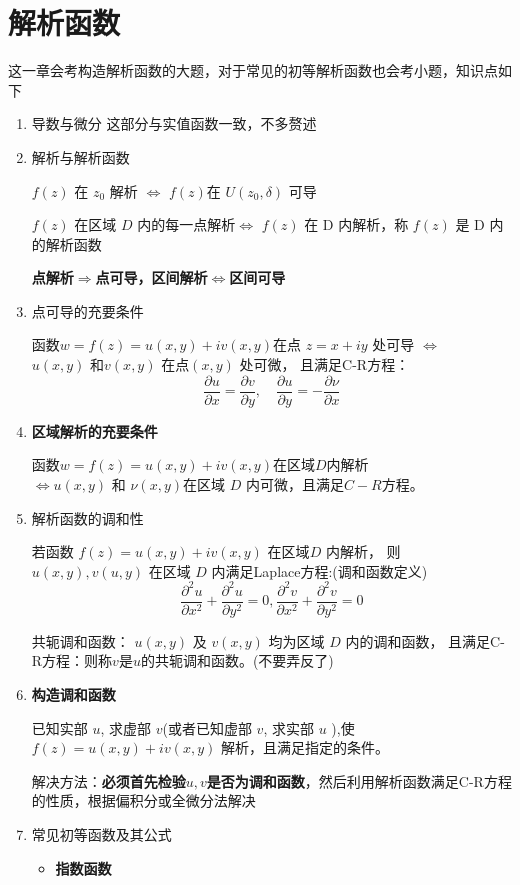 \documentclass[a4paper,11pt,UTF8]{article}
\begin{document}
\section{解析函数}
这一章会考构造解析函数的大题，对于常见的初等解析函数也会考小题，知识点如下
\begin{enumerate}
	\item 导数与微分
	这部分与实值函数一致，不多赘述
	\item 解析与解析函数
	
	$f(z)$ 在 $z_0$ 解析 $\Leftrightarrow$ $f(z)$在 $U(z_0,\delta)$ 可导
	
	$f(z)$ 在区域 $D$ 内的每一点解析$\Leftrightarrow$ $f(z)$ 在 D 内解析，称 $f(z)$ 是 D 内的解析函数
	
	\textbf{点解析$\Rightarrow$点可导，区间解析$\Leftrightarrow$区间可导}
	\item 点可导的充要条件
	
	函数$w=f(z)=u(x,y)+iv(x,y)$在点 $z=x+iy$ 处可导
	$\Leftrightarrow$\\
	$u(x,y)$ 和$v(x,y)$ 在点$(x,y)$ 处可微， 且满足C-R方程：
	$$\frac{\partial u}{\partial x}=\frac{\partial v}{\partial y},\quad\frac{\partial u}{\partial y}=-\frac{\partial\nu}{\partial x}$$
	\item \textbf{区域解析的充要条件}
	
	函数$w=f(z)=u(x,y)+iv(x,y)$在区域$D$内解析\\
	$\Leftrightarrow$$u(x,y)$ 和 $\nu(x,y)$在区域 $D$ 内可微，且满足$C-R$方程。
	\item 解析函数的调和性
	
	若函数 $f(z)=u(x,y)+iv(x,y)$ 在区域$D$ 内解析， 则 $u(x,y),v(u,y)$ 在区域 $D$ 内满足Laplace方程:(调和函数定义)
	$$\frac{\partial^2u}{\partial x^2}+\frac{\partial^2u}{\partial y^2}=0,\frac{\partial^2v}{\partial x^2}+\frac{\partial^2v}{\partial y^2}=0$$
	
	共轭调和函数： $u(x,y)$ 及 $v(x,y)$ 均为区域 $D$ 内的调和函数， 且满足C-R方程：则称$v$是$u$的共轭调和函数。(不要弄反了)
	\item \textbf{构造调和函数}
	
	已知实部 $u$, 求虚部 $v $(或者已知虚部 $v$, 求实部 $u$ ),使 $f(z)=u(x,y)+iv(x,y)$ 解析，且满足指定的条件。
	
	解决方法：\textbf{必须首先检验$u,v$是否为调和函数}，然后利用解析函数满足C-R方程的性质，根据偏积分或全微分法解决
	\item 常见初等函数及其公式
	\begin{itemize}
		\item \textbf{指数函数}
		

\end{itemize}
\end{enumerate}
\end{document}
